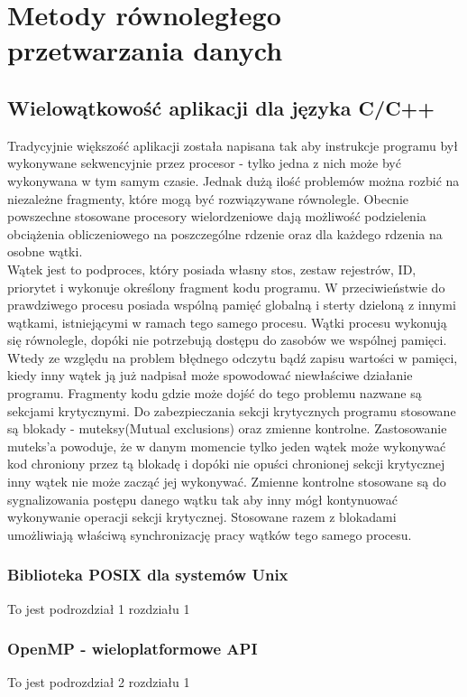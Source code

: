 \documentclass[document.tex]{subfiles}
\begin{document}
\chapter{Metody równoległego przetwarzania danych}

\section{Wielowątkowość aplikacji dla języka C/C++}
\indent Tradycyjnie większość aplikacji została napisana 
tak aby instrukcje programu był wykonywane sekwencyjnie przez
procesor - tylko jedna z nich może być wykonywana w tym samym czasie.
Jednak dużą ilość problemów można rozbić na niezależne fragmenty,
 które mogą być rozwiązywane równolegle. Obecnie powszechne stosowane procesory
 wielordzeniowe dają możliwość podzielenia obciążenia obliczeniowego na poszczególne rdzenie oraz dla każdego rdzenia na osobne wątki.\cite{Computer_Architecture_Patterson_Hennesy}\cite{Parallel_computing_article} \\
 \indent Wątek jest to podproces, który posiada własny stos, zestaw rejestrów, ID, priorytet i wykonuje określony fragment kodu programu. W przeciwieństwie do prawdziwego procesu posiada wspólną pamięć globalną i sterty dzieloną z innymi wątkami, istniejącymi w ramach tego samego procesu. Wątki procesu wykonują się równolegle, dopóki nie potrzebują dostępu do zasobów we wspólnej pamięci.\cite{POSIX_article}\cite{POSIX_tutorial} Wtedy ze względu na problem błędnego odczytu bądź zapisu wartości w pamięci, kiedy inny wątek ją już nadpisał może spowodować niewłaściwe działanie programu. Fragmenty kodu gdzie może dojść do tego problemu nazwane są sekcjami krytycznymi. Do zabezpieczania sekcji krytycznych programu stosowane są blokady - muteksy(Mutual exclusions) oraz zmienne kontrolne. Zastosowanie muteks'a powoduje, że w danym momencie tylko jeden wątek może wykonywać kod chroniony przez tą blokadę i dopóki nie opuści chronionej sekcji krytycznej inny wątek nie może zacząć jej wykonywać. Zmienne kontrolne stosowane są do
 sygnalizowania postępu danego wątku tak aby inny mógł kontynuować wykonywanie operacji sekcji krytycznej. Stosowane razem z blokadami umożliwiają właściwą synchronizację pracy wątków tego samego procesu.
 \cite{POSIX_Butenhof}\cite{C++_Stroustrup}
	\subsection{Biblioteka POSIX dla systemów Unix}
	To jest podrozdział 1 rozdziału 1
	\subsection{OpenMP - wieloplatformowe API}
	To jest podrozdział 2 rozdziału 1
\end{document}
